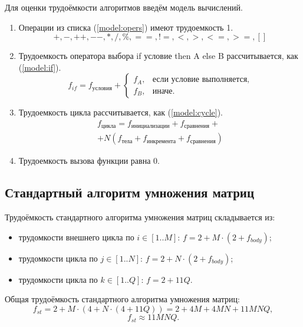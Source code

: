 Для оценки трудоёмкости алгоритмов введём модель вычислений.
\begin{enumerate}
	\item Операции из списка (\ref{model:opers}) имеют трудоемкость 1.
	\begin{equation}
		\label{model:opers}
		+, -, ++, {-}-, *, /, \%, ==, !=, <, >, <=, >=, []
	\end{equation}
	\item Трудоемкость оператора выбора if условие then A else B рассчитывается, как (\ref{model:if}).
	\begin{equation}
		\label{model:if}
		f_{if} = f_{\text{условия}} +
		\begin{cases}
			f_A, & \text{если условие выполняется,}\\
			f_B, & \text{иначе.}
		\end{cases}
	\end{equation}
	\item Трудоемкость цикла рассчитывается, как (\ref{model:cycle}).
	\begin{equation}
		\label{model:cycle}
		\begin{gathered}
		f_{\text{цикла}} = f_{\text{инициализации}} + f_{\text{сравнения}} + \\
		+ N(f_{\text{тела}} + f_{\text{инкремента}} + f_{\text{сравнения}})
		\end{gathered}
	\end{equation}
	\item Трудоемкость вызова функции равна 0.
\end{enumerate}

\subsection{Стандартный алгоритм умножения \newline матриц}

Трудоёмкость стандартного алгоритма умножения матриц складывается из:
\begin{itemize}
	\item трудомкости внешнего цикла по $i \in [1..M]$: $f = 2 + M \cdot (2 + f_{body})$;
	\item трудомкости цикла по $j \in [1..N]$: $f = 2 + N \cdot (2 + f_{body})$;
	\item трудомкости цикла по $k \in [1..Q]$: $f = 2 + 11Q$.
\end{itemize}

Общая трудоёмкость стандартного алгоритма умножения матриц:
\begin{equation}
	f_{st} = 2 + M\cdot(4 + N\cdot(4 + 11Q)) = 2 + 4M + 4MN + 11MNQ,
\end{equation}
\begin{equation}
	f_{st} \approx 11MNQ.
\end{equation}

